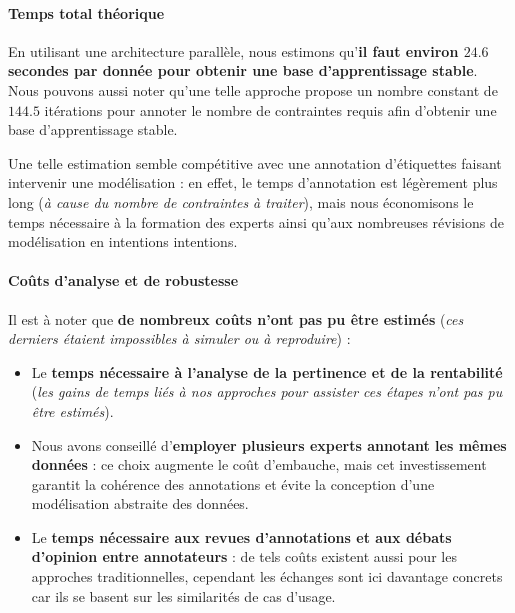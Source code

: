 		
		\paragraph{\textcolor{colorSilverLakeBlue}{\faCheckSquare} Temps total théorique}
		
			En utilisant une architecture parallèle, nous estimons qu'\textbf{il faut environ $24.6$ secondes par donnée pour obtenir une base d'apprentissage stable}.
			Nous pouvons aussi noter qu'une telle approche propose un nombre constant de $144.5$ itérations pour annoter le nombre de contraintes requis afin d'obtenir une base d'apprentissage stable.
			
			Une telle estimation semble compétitive avec une annotation d'étiquettes faisant intervenir une modélisation : en effet, le temps d'annotation est légèrement plus long (\textit{à cause du nombre de contraintes à traiter}), mais nous économisons le temps nécessaire à la formation des experts ainsi qu'aux nombreuses révisions de modélisation en intentions intentions.
		
		
		\paragraph{\textcolor{colorSilverLakeBlue}{\faCheckSquare} Coûts d'analyse et de robustesse}
			
			Il est à noter que \textbf{de nombreux coûts n'ont pas pu être estimés} (\textit{ces derniers étaient impossibles à simuler ou à reproduire}) :
			\begin{itemize}
				\item Le \textbf{temps nécessaire à l'analyse de la pertinence et de la rentabilité}
				(\textit{les gains de temps liés à nos approches pour assister ces étapes n'ont pas pu être estimés}).
				\item Nous avons conseillé d'\textbf{employer plusieurs experts annotant les mêmes données} : ce choix augmente le coût d'embauche, mais cet investissement garantit la cohérence des annotations et évite la conception d'une modélisation abstraite des données.
				\item Le \textbf{temps nécessaire aux revues d'annotations et aux débats d'opinion entre annotateurs} : de tels coûts existent aussi pour les approches traditionnelles, cependant les échanges sont ici davantage concrets car ils se basent sur les similarités de cas d'usage.
			\end{itemize}
			
